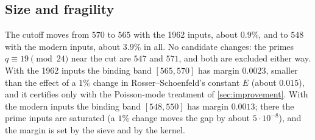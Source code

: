 \documentclass[11pt]{article}
\theoremstyle{definition}
\begin{document}
\subsection{Size and fragility}
The cutoff moves from $570$ to $565$ with the 1962 inputs, about $0.9\%$, and to $548$ with the modern inputs, about $3.9\%$ in all. No candidate changes: the primes $q \equiv 19 \pmod{24}$ near the cut are $547$ and $571$, and both are excluded either way. With the 1962 inputs the binding band $[565, 570]$ has margin $0.0023$, smaller than the effect of a $1\%$ change in Rosser--Schoenfeld's constant $E$ (about $0.015$), and it certifies only with the Poisson-mode treatment of \cref{sec:improvement}. With the modern inputs the binding band $[548, 550]$ has margin $0.0013$; there the prime inputs are saturated (a $1\%$ change moves the gap by about $5\cdot10^{-8}$), and the margin is set by the sieve and by the kernel.

\end{document}
